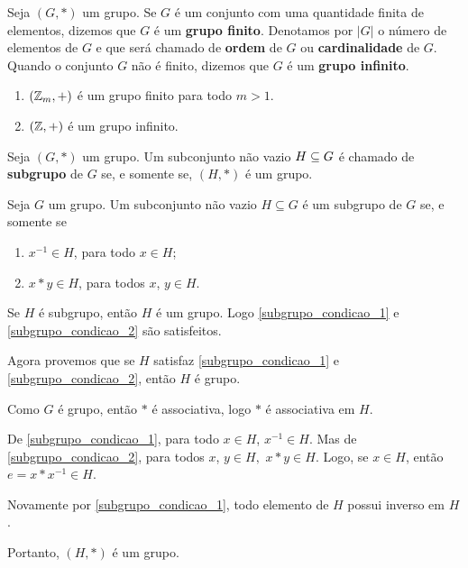 

\begin{definicao}
	Seja $(G,*)$ um grupo. Se $G$ {\'e} um conjunto com uma quantidade finita de elementos, dizemos que $G$ {\'e} um \textbf{grupo finito}. Denotamos por $|G|$ o n{\'u}mero de elementos de $G$ e que ser{\'a} chamado de \textbf{ordem} de $G$ ou \textbf{cardinalidade} de $G$. Quando o conjunto $G$ n{\~a}o {\'e} finito, dizemos que $G$ {\'e} um \textbf{grupo infinito}.
\end{definicao}

\begin{exemplos}
	\begin{enumerate}[label={\arabic*})]
		\item $(\mathbb{Z}_m, +)$ {\'e} um grupo finito para todo $m>1$.
		\item $(\mathbb{Z}, +)$ {\'e} um grupo infinito.
	\end{enumerate}	
\end{exemplos}

\begin{definicao}
	Seja $(G,*)$ um grupo. Um subconjunto n{\~a}o vazio $H\subseteq G$ {\'e} chamado de \textbf{subgrupo} de $G$ se, e somente se, $(H,*)$ {\'e} um grupo.
\end{definicao}

\begin{proposicao}
	Seja $G$ um grupo. Um subconjunto n{\~a}o vazio $H\subseteq G$ {\'e} um subgrupo de $G$ se, e somente se
	\begin{enumerate}[label={\roman*})]
		\item\label{subgrupo_condicao_1} $x^{-1}\in H$, para todo $x \in H$;
		\item\label{subgrupo_condicao_2} $x*y\in H$, para todos $x$, $y \in H$.
	\end{enumerate}
\end{proposicao}
\begin{prova}
	Se $H$ {\'e} subgrupo, ent{\~a}o $H$ {\'e} um grupo. Logo \ref{subgrupo_condicao_1} e \ref{subgrupo_condicao_2} s{\~a}o satisfeitos.

	Agora provemos que se $H$ satisfaz \ref{subgrupo_condicao_1} e \ref{subgrupo_condicao_2}, ent{\~a}o $H$ {\'e} grupo.

	Como $G$ {\'e} grupo, ent{\~a}o $*$ {\'e} associativa, logo $*$ {\'e} associativa em $H$.

	De \ref{subgrupo_condicao_1}, para todo $x \in H$, $x^{-1}\in H$. Mas de \ref{subgrupo_condicao_2}, para todos $x$, $y \in H,$ $x*y \in H$. Logo, se $x\in H$, ent{\~a}o $e = x*x^{-1} \in H$.

	Novamente por \ref{subgrupo_condicao_1}, todo elemento de $H$ possui inverso em $H$.

	Portanto, $(H,*)$ {\'e} um grupo.
\end{prova}


